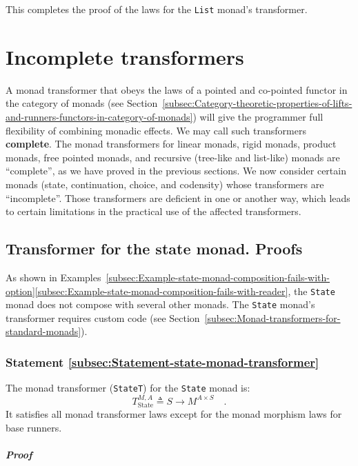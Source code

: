 This completes the proof of the laws for the \lstinline!List! monad\textsf{'}s
transformer.

\section{Incomplete transformers}

A monad transformer that obeys the laws of a pointed and co-pointed
functor in the category of monads (see Section~\ref{subsec:Category-theoretic-properties-of-lifts-and-runners-functors-in-category-of-monads})
will give the programmer full flexibility of combining monadic effects.
We may call such transformers \textbf{complete}.
The monad transformers for linear monads, rigid monads, product monads,
free pointed monads, and recursive (tree-like and list-like) monads
are \textsf{``}complete\textsf{''}, as we have proved in the previous sections. We
now consider certain monads (state, continuation, choice, and codensity)
whose transformers are \textsf{``}incomplete\textsf{''}. Those transformers are deficient
in one or another way, which leads to certain limitations in the practical
use of the affected transformers.

\subsection{Transformer for the state monad. Proofs}

As shown in Examples~\ref{subsec:Example-state-monad-composition-fails-with-option}\textendash \ref{subsec:Example-state-monad-composition-fails-with-reader},
the \lstinline!State! monad does not compose with several other monads.
The \lstinline!State! monad\textsf{'}s transformer requires custom code (see
Section~\ref{subsec:Monad-transformers-for-standard-monads}).

\subsubsection{Statement \label{subsec:Statement-state-monad-transformer}\ref{subsec:Statement-state-monad-transformer}}

The monad transformer (\lstinline!StateT!) for the \lstinline!State!
monad is:
\[
T_{\text{State}}^{M,A}\triangleq S\rightarrow M^{A\times S}\quad.
\]
It satisfies all monad transformer laws except for the monad morphism
laws for base runners.

\subparagraph{Proof}

